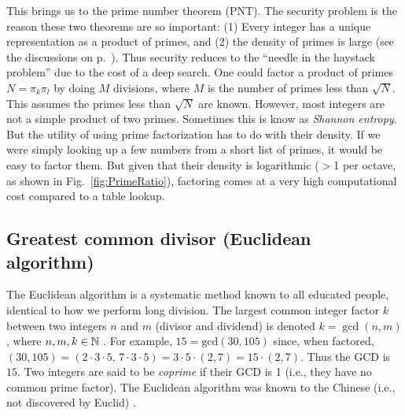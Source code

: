 \documentclass{ximera}
\begin{document}
This brings us to the prime number theorem (PNT). The security problem is the reason these two theorems are so important:
 (1) Every integer has a unique representation as a product of primes, and
 (2) the density of primes is large (see the discussions on p.~\pageref{FT:PNT}).
Thus security reduces to the ``needle in the haystack problem'' due to the cost of a deep search. 
One could factor a product of primes $N=\pi_k \pi_l$ by doing $M$ divisions, where $M$
is the number of primes less than $\sqrt{N}$. This assumes the primes less than $\sqrt{N}$ are known.
However, most integers are not a simple product of two primes.
Sometimes this is know as \emph{Shannon entropy}.
\label{entropyS}   %
But the utility of using prime factorization has to do with their density.  If we were simply looking up
a few numbers from a short list of primes, it would be easy to factor them. But given that their density
is logarithmic ($>$1 per octave, as shown in Fig.~\ref{fig:PrimeRatio}), factoring comes at a very high computational cost compared to a table lookup.

\subsection {Greatest common divisor (Euclidean algorithm) \label{Lec 5}} 

The Euclidean algorithm is a systematic method known to all
educated people, identical to how we perform long division.
The largest common integer factor $k$ between two integers $n$ and $m$ (divisor and dividend) is denoted $k = \gcd(n,m)$,
where $n,m,k \in \mathbb{N}$ \citep{GrahamEtAl94}. 
For example, $15 = \text{gcd}(30, 105)$ since, when factored,
$(30, 105) = (2\cdot 3 \cdot 5, \, 7 \cdot 3 \cdot 5)= 3\cdot 5 \cdot (2,7) = 15\cdot(2, 7)$. 
Thus the GCD is $15$.
Two integers are said to be \emph{coprime} if their GCD is 1
(i.e., they have no common prime factor).
The Euclidean algorithm was known to the Chinese (i.e., not discovered by Euclid) \citep[p.~41]{JS10}.
\end{document}
